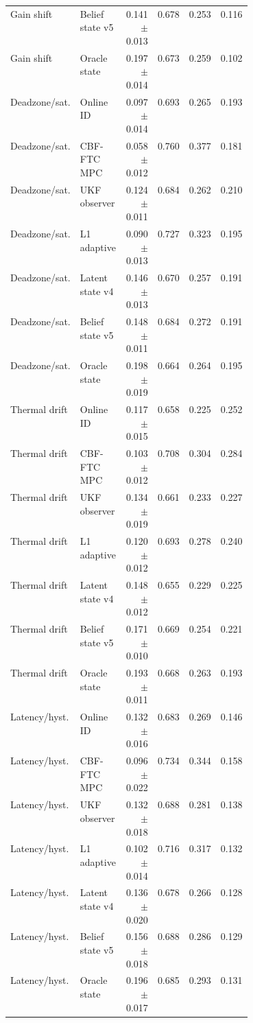 \documentclass{article}
\begin{document}
\begin{center}
\begin{longtable}{p{0.15\linewidth}p{0.26\linewidth}rrrr}
Gain shift & Belief state v5 & 0.141 $\pm$ 0.013 & 0.678 & 0.253 & 0.116\\
Gain shift & Oracle state & 0.197 $\pm$ 0.014 & 0.673 & 0.259 & 0.102\\
Deadzone/sat. & Online ID & 0.097 $\pm$ 0.014 & 0.693 & 0.265 & 0.193\\
Deadzone/sat. & CBF-FTC MPC & 0.058 $\pm$ 0.012 & 0.760 & 0.377 & 0.181\\
Deadzone/sat. & UKF observer & 0.124 $\pm$ 0.011 & 0.684 & 0.262 & 0.210\\
Deadzone/sat. & L1 adaptive & 0.090 $\pm$ 0.013 & 0.727 & 0.323 & 0.195\\
Deadzone/sat. & Latent state v4 & 0.146 $\pm$ 0.013 & 0.670 & 0.257 & 0.191\\
Deadzone/sat. & Belief state v5 & 0.148 $\pm$ 0.011 & 0.684 & 0.272 & 0.191\\
Deadzone/sat. & Oracle state & 0.198 $\pm$ 0.019 & 0.664 & 0.264 & 0.195\\
Thermal drift & Online ID & 0.117 $\pm$ 0.015 & 0.658 & 0.225 & 0.252\\
Thermal drift & CBF-FTC MPC & 0.103 $\pm$ 0.012 & 0.708 & 0.304 & 0.284\\
Thermal drift & UKF observer & 0.134 $\pm$ 0.019 & 0.661 & 0.233 & 0.227\\
Thermal drift & L1 adaptive & 0.120 $\pm$ 0.012 & 0.693 & 0.278 & 0.240\\
Thermal drift & Latent state v4 & 0.148 $\pm$ 0.012 & 0.655 & 0.229 & 0.225\\
Thermal drift & Belief state v5 & 0.171 $\pm$ 0.010 & 0.669 & 0.254 & 0.221\\
Thermal drift & Oracle state & 0.193 $\pm$ 0.011 & 0.668 & 0.263 & 0.193\\
Latency/hyst. & Online ID & 0.132 $\pm$ 0.016 & 0.683 & 0.269 & 0.146\\
Latency/hyst. & CBF-FTC MPC & 0.096 $\pm$ 0.022 & 0.734 & 0.344 & 0.158\\
Latency/hyst. & UKF observer & 0.132 $\pm$ 0.018 & 0.688 & 0.281 & 0.138\\
Latency/hyst. & L1 adaptive & 0.102 $\pm$ 0.014 & 0.716 & 0.317 & 0.132\\
Latency/hyst. & Latent state v4 & 0.136 $\pm$ 0.020 & 0.678 & 0.266 & 0.128\\
Latency/hyst. & Belief state v5 & 0.156 $\pm$ 0.018 & 0.688 & 0.286 & 0.129\\
Latency/hyst. & Oracle state & 0.196 $\pm$ 0.017 & 0.685 & 0.293 & 0.131\\

\end{longtable}
\end{center}
\end{document}
